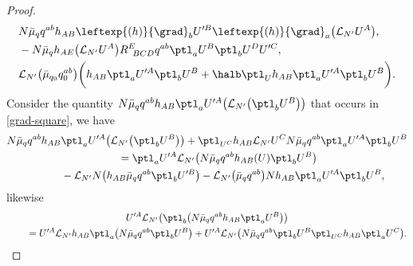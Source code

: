 \begin{proof}
\begin{align}
&N \bar{\mu}_q q^{ab} h_{AB} \leftexp{(h)}{\grad}_b U'^B \leftexp{(h)}{\grad}_a \bigl(\mathcal{L}_{N'} U^A\bigr),\nonumber\\
&- N \bar{\mu}_q h_{AE} \bigl(\mathcal{L}_{N'} U^A\bigr) R^E_{\,\,\,BCD} q^{ab} \ptl_a U^B \ptl_b U^D U'^C, \nonumber\\
& \mathcal{L}_{N'} \bigl(\bar{\mu}_{q_0} q^{ab}_0\bigr) \biggl(h_{AB} \ptl_a U'^A \ptl_b U^B + \halb \ptl_{U}h_{AB} \ptl_a U'^A \ptl_b U^B\biggr).\label{grad-square}
\end{align}
Consider the quantity $N \bar{\mu}_q q^{ab} h_{AB} \ptl_a U'^A \bigl(\mathcal{L}_{N'}\bigl(\ptl_b U^B\bigr)\bigr)$ that occurs in \eqref{grad-square}, we have
\begin{gather*}
N \bar{\mu}_q q^{ab} h_{AB} \ptl_a U'^A \bigl(\mathcal{L}_{N'}\bigl(\ptl_b U^B\bigr)\bigr) + \ptl_{U^C} h_{AB} \mathcal{L}_{N'} U^C N \bar{\mu}_qq^{ab}\ptl_a U'^A \ptl_b U^B \notag\\
\qquad{}= \ptl_a U'^A \mathcal{L}_{N'} \bigl(N \bar{\mu}_q q^{ab} h_{AB}(U) \ptl_b U^B\bigr) \notag\\
\quad\qquad{} -\mathcal{L}_{N'} N \bigl(h_{AB} \bar{\mu}_q q^{ab} \ptl_b U'^B\bigr) - \mathcal{L}_{N'} \bigl(\bar{\mu}_q q^{ab}\bigr) N h_{AB} \ptl_a U'^A\ptl_b U^B,
\end{gather*}
likewise
\begin{gather*}
 U'^A \mathcal{L}_{N'} \bigl(\ptl_b \bigl(N \bar{\mu}_q q^{ab} h_{AB} \ptl_a U^B\bigr) \bigr) \notag\\
\qquad{}= U'^A \mathcal{L}_{N'} h_{AB}\ptl_a \bigl(N \bar{\mu}_q q^{ab} \ptl_b U^B\bigr) + U'^A \mathcal{L}_{N'} \bigl(N \bar{\mu}_q q^{ab} \ptl_b U^B \ptl_{U^C} h_{AB} \ptl_a U^C\bigr).
\end{gather*}


\end{proof}
